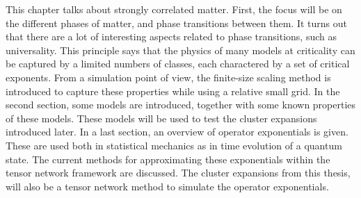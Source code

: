 This chapter talks about strongly correlated matter. First, the focus will be on the different phases of matter, and phase transitions between them. It turns out that there are a lot of interesting aspects related to phase transitions, such as universality. This principle says that the physics of many models at criticality can be captured by a limited numbers of classes, each charactered by a set of critical exponents. From a simulation point of view, the finite-size scaling method is introduced to capture these properties while using a relative small grid.
In the second section, some models are introduced, together with some known properties of these models. These models will be used to test the cluster expansions introduced later.
In a last section, an overview of operator exponentials is given. These are used both in statistical mechanics as in time evolution of a quantum state. The current methods for approximating these exponentials within the tensor network framework are discussed. The cluster expansions from this thesis, will also be a tensor network method to simulate the operator exponentials.